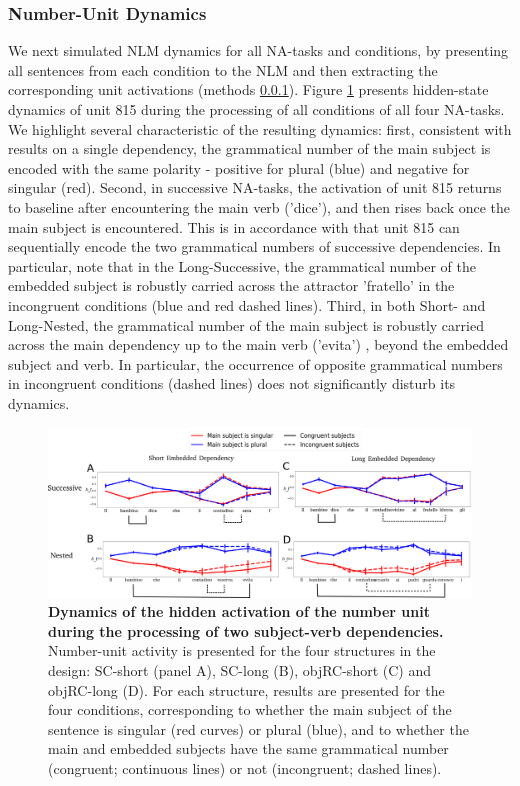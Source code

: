 \subsubsection{Number-Unit Dynamics}
We next simulated NLM dynamics for all NA-tasks and conditions, by presenting all sentences from each condition to the NLM and then extracting the corresponding unit activations (methods \ref{}). Figure \ref{fig:2by2_dynamics} presents hidden-state dynamics  of unit 815 during the processing of all conditions of all four NA-tasks. We highlight several characteristic of the resulting dynamics: first, consistent with results on a single dependency, the grammatical number of the main subject is encoded with the same polarity - positive for plural (blue) and negative for singular (red). Second, in successive NA-tasks, the activation of unit 815 returns to baseline after encountering the main verb ('dice'), and then rises back once the main subject is encountered. This is in accordance with that unit 815 can sequentially encode the two grammatical numbers of successive dependencies. In particular, note that in the Long-Successive, the grammatical number of the embedded subject is robustly carried across the attractor 'fratello' in the incongruent conditions (blue and red dashed lines). Third, in both Short- and Long-Nested, the grammatical number of the main subject is robustly carried across the main dependency up to the main verb ('evita') , beyond the embedded subject and verb. In particular, the occurrence of opposite grammatical numbers in incongruent conditions (dashed lines) does not significantly disturb its dynamics. 

\begin{figure}
    \centering
    \includegraphics[width=\textwidth]{figures/model_activations.png}
    \caption{\textbf{Dynamics of the hidden activation of the number unit during the processing of two subject-verb dependencies.} Number-unit activity is presented for the four structures in the design: SC-short (panel A), SC-long (B), objRC-short (C) and objRC-long (D). For each structure, results are presented for the four conditions, corresponding to whether the main subject of the sentence is singular (red curves) or plural (blue), and to whether the main and embedded subjects have the same grammatical number (congruent; continuous lines) or not (incongruent; dashed lines).}
    \label{fig:2by2_dynamics}
\end{figure}


